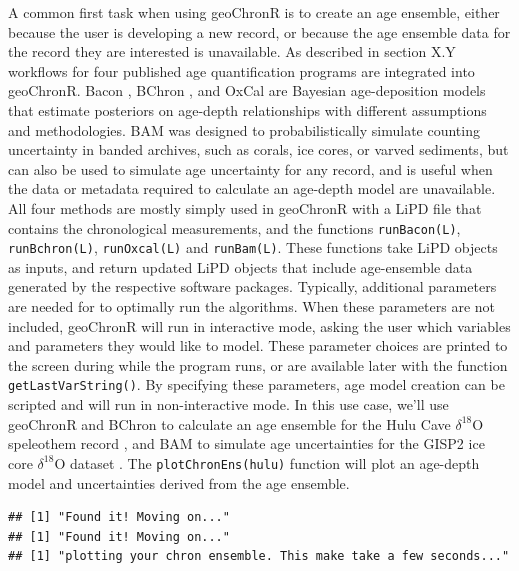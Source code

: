 \documentclass[gc, manuscript]{copernicus}
\begin{document}
A common first task when using geoChronR is to create an age ensemble,
either because the user is developing a new record, or because the age
ensemble data for the record they are interested is unavailable. As
described in section X.Y workflows for four published age quantification
programs are integrated into geoChronR. Bacon \citep{bacon}, BChron
\citep{parnell2008flexible}, and OxCal \citep{ramsey2008deposition} are
Bayesian age-deposition models that estimate posteriors on age-depth
relationships with different assumptions and methodologies. BAM
\citep{BAM} was designed to probabilistically simulate counting
uncertainty in banded archives, such as corals, ice cores, or varved
sediments, but can also be used to simulate age uncertainty for any
record, and is useful when the data or metadata required to calculate an
age-depth model are unavailable. All four methods are mostly simply used
in geoChronR with a LiPD file that contains the chronological
measurements, and the functions \texttt{runBacon(L)},
\texttt{runBchron(L)}, \texttt{runOxcal(L)} and \texttt{runBam(L)}.
These functions take LiPD objects as inputs, and return updated LiPD
objects that include age-ensemble data generated by the respective
software packages. Typically, additional parameters are needed for to
optimally run the algorithms. When these parameters are not included,
geoChronR will run in interactive mode, asking the user which variables
and parameters they would like to model. These parameter choices are
printed to the screen during while the program runs, or are available
later with the function \texttt{getLastVarString()}. By specifying these
parameters, age model creation can be scripted and will run in
non-interactive mode. In this use case, we'll use geoChronR and BChron
\citep{parnell2008flexible} to calculate an age ensemble for the Hulu
Cave \(\delta^{18}\)O speleothem record \citep{hulu2001}, and BAM
\citep{BAM} to simulate age uncertainties for the GISP2 ice core
\(\delta^{18}\)O dataset \citep{alley}. The \texttt{plotChronEns(hulu)}
function will plot an age-depth model and uncertainties derived from the
age ensemble.

\begin{verbatim}
## [1] "Found it! Moving on..."
## [1] "Found it! Moving on..."
## [1] "plotting your chron ensemble. This make take a few seconds..."
\end{verbatim}
\end{document}
